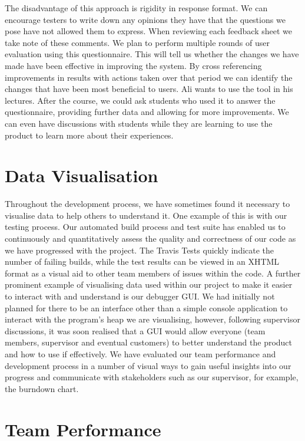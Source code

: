 \documentclass[10pt, a4paper]{article}
\begin{document}
The disadvantage of this approach is rigidity in response format. We can encourage testers to write down any opinions they have that the questions we pose have not allowed them to express. When reviewing each feedback sheet we take note of these comments. 
We plan to perform multiple rounds of user evaluation using this questionnaire. This will tell us whether the changes we have made have been effective in improving the system. By cross referencing improvements in results with actions taken over that period we can identify the changes that have been most beneficial to users. Ali wants to use the tool in his lectures. After the course, we could ask students who used it to answer the questionnaire, providing further data and allowing for more improvements. We can even have discussions with students while they are learning to use the product to learn more about their experiences.

\section{Data Visualisation}

Throughout the development process, we have sometimes found it necessary to visualise data to help others to understand it. One example of this is with our testing process. Our automated build process and test suite has enabled us to continuously and quantitatively assess the quality and correctness of our code as we have progressed with the project. The Travis Tests quickly indicate the number of failing builds, while the test results can be viewed in an XHTML format as a visual aid to other team members of issues within the code. A further prominent example of visualising data used within our project to make it easier to interact with and understand is our debugger GUI. We had initially not planned for there to be an interface other than a simple console application to interact with the program’s heap we are visualising, however, following supervisor discussions, it was soon realised that a GUI would allow everyone (team members, supervisor and eventual customers) to better understand the product and how to use if effectively. We have evaluated our team performance and development process in a number of visual ways to gain useful insights into our progress and communicate with stakeholders such as our supervisor, for example, the burndown chart. 

\section{Team Performance}
\end{document}
